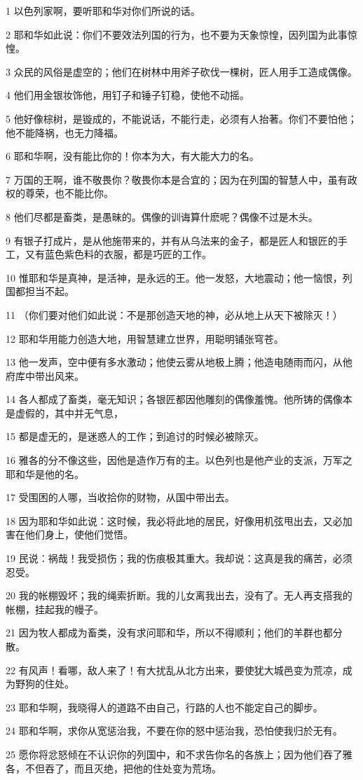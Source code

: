 \par 1 以色列家啊，要听耶和华对你们所说的话。
\par 2 耶和华如此说：你们不要效法列国的行为，也不要为天象惊惶，因列国为此事惊惶。
\par 3 众民的风俗是虚空的；他们在树林中用斧子砍伐一棵树，匠人用手工造成偶像。
\par 4 他们用金银妆饰他，用钉子和锤子钉稳，使他不动摇。
\par 5 他好像棕树，是镟成的，不能说话，不能行走，必须有人抬著。你们不要怕他；他不能降祸，也无力降福。
\par 6 耶和华啊，没有能比你的！你本为大，有大能大力的名。
\par 7 万国的王啊，谁不敬畏你？敬畏你本是合宜的；因为在列国的智慧人中，虽有政权的尊荣，也不能比你。
\par 8 他们尽都是畜类，是愚昧的。偶像的训诲算什麽呢？偶像不过是木头。
\par 9 有银子打成片，是从他施带来的，并有从乌法来的金子，都是匠人和银匠的手工，又有蓝色紫色料的衣服，都是巧匠的工作。
\par 10 惟耶和华是真神，是活神，是永远的王。他一发怒，大地震动；他一恼恨，列国都担当不起。
\par 11 （你们要对他们如此说：不是那创造天地的神，必从地上从天下被除灭！）
\par 12 耶和华用能力创造大地，用智慧建立世界，用聪明铺张穹苍。
\par 13 他一发声，空中便有多水激动；他使云雾从地极上腾；他造电随雨而闪，从他府库中带出风来。
\par 14 各人都成了畜类，毫无知识；各银匠都因他雕刻的偶像羞愧。他所铸的偶像本是虚假的，其中并无气息，
\par 15 都是虚无的，是迷惑人的工作；到追讨的时候必被除灭。
\par 16 雅各的分不像这些，因他是造作万有的主。以色列也是他产业的支派，万军之耶和华是他的名。
\par 17 受围困的人哪，当收拾你的财物，从国中带出去。
\par 18 因为耶和华如此说：这时候，我必将此地的居民，好像用机弦甩出去，又必加害在他们身上，使他们觉悟。
\par 19 民说：祸哉！我受损伤；我的伤痕极其重大。我却说：这真是我的痛苦，必须忍受。
\par 20 我的帐棚毁坏；我的绳索折断。我的儿女离我出去，没有了。无人再支搭我的帐棚，挂起我的幔子。
\par 21 因为牧人都成为畜类，没有求问耶和华，所以不得顺利；他们的羊群也都分散。
\par 22 有风声！看哪，敌人来了！有大扰乱从北方出来，要使犹大城邑变为荒凉，成为野狗的住处。
\par 23 耶和华啊，我晓得人的道路不由自己，行路的人也不能定自己的脚步。
\par 24 耶和华啊，求你从宽惩治我，不要在你的怒中惩治我，恐怕使我归於无有。
\par 25 愿你将忿怒倾在不认识你的列国中，和不求告你名的各族上；因为他们吞了雅各，不但吞了，而且灭绝，把他的住处变为荒场。

